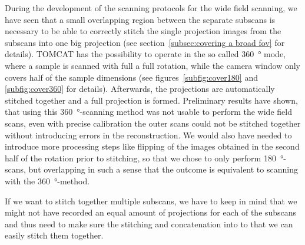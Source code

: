 During the development of the scanning protocols for the wide field scanning, we have seen that a small overlapping region between the separate subscans is necessary to be able to correctly stitch the single projection images from the subscans into one big projection (see section~\ref{subsec:covering a broad fov} for details). TOMCAT has the possibility to operate in the so called \SI{360}{\degree} mode, where a sample is scanned with full a full rotation, while the camera window only covers half of the sample dimensions (see figures~\ref{subfig:cover180} and \ref{subfig:cover360} for details). Afterwards, the projections are automatically stitched together and a full projection is formed. Preliminary results have shown, that using this \SI{360}{\degree}-scanning method was not usable to perform the wide field scans, even with precise calibration the outer scans could not be stitched together without introducing errors in the reconstruction. We would also have needed to introduce more processing steps like flipping of the images obtained in the second half of the rotation prior to stitching, so that we chose to only perform \SI{180}{\degree}-scans, but overlapping in such a sense that the outcome is equivalent to scanning with the \SI{360}{\degree}-method.

%	

If we want to stitch together multiple subscans,  we have to keep in mind that we might not have recorded an equal amount of projections for each of the subscans and thus need to make sure the stitching and concatenation into to that we can easily stitch them together.

